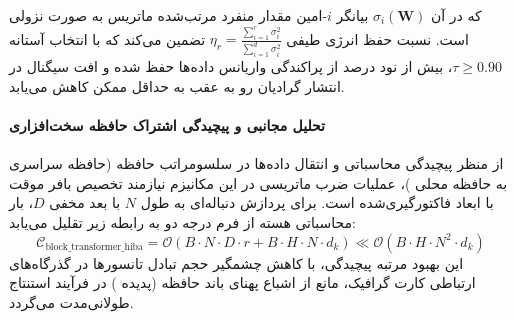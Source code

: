 که در آن $\sigma_i(\mathbf{W})$ بیانگر $i$-امین مقدار منفرد مرتب‌شده ماتریس به صورت نزولی است. نسبت حفظ انرژی طیفی $\eta_r = \frac{\sum_{i=1}^r \sigma_i^2}{\sum_{i=1}^{d} \sigma_i^2}$ تضمین می‌کند که با انتخاب آستانه $\tau \ge 0.90$، بیش از نود درصد از پراکندگی واریانس داده‌ها حفظ شده و افت سیگنال در انتشار گرادیان رو به عقب به حداقل ممکن کاهش می‌یابد.

\paragraph{تحلیل مجانبی و پیچیدگی اشتراک حافظه سخت‌افزاری}
از منظر پیچیدگی محاسباتی و انتقال داده‌ها در سلسومراتب حافظه (حافظه سراسری  به حافظه محلی )، عملیات ضرب ماتریسی در این مکانیزم نیازمند تخصیص بافر موقت با ابعاد فاکتورگیری‌شده است. برای پردازش دنباله‌ای به طول $N$ با بعد مخفی $D$، بار محاسباتی هسته از فرم درجه دو به رابطه زیر تقلیل می‌یابد:
\begin{equation}
\label{eq:complexity_block_transformer_hiba}
\mathcal{C}_{\text{block\_transformer\_hiba}} = \mathcal{O}\left( B \cdot N \cdot D \cdot r + B \cdot H \cdot N \cdot d_k \right) \ll \mathcal{O}\left( B \cdot H \cdot N^2 \cdot d_k \right)
\end{equation}
این بهبود مرتبه پیچیدگی، با کاهش چشمگیر حجم تبادل تانسورها در گذرگاه‌های ارتباطی کارت گرافیک، مانع از اشباع پهنای باند حافظه (پدیده ) در فرآیند استنتاج طولانی‌مدت می‌گردد.